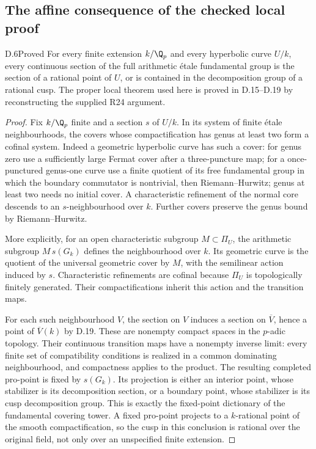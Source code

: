\subsection{The affine consequence of the checked local proof}

\begin{claim}{D.6}{Proved}
For every finite extension $k/\Q_p$ and every hyperbolic curve
$U/k$, every continuous section of the full arithmetic
\'{e}tale fundamental group is the section of a rational point
of $U$, or is contained in the decomposition group of a rational
cusp. The proper local theorem used here is proved in D.15--D.19
by reconstructing the supplied R24 argument.
\end{claim}
\begin{proof}
Fix $k/\Q_p$ finite and a section $s$ of $U/k$. In its system of
finite \'etale neighbourhoods, the covers whose compactification
has genus at least two form a cofinal system. Indeed a geometric
hyperbolic curve has such a cover: for genus zero use a sufficiently
large Fermat cover after a three-puncture map; for a once-punctured
genus-one curve use a finite quotient of its free fundamental group
in which the boundary commutator is nontrivial, then
Riemann--Hurwitz; genus at least two needs no initial cover.
A characteristic refinement of the normal core descends to an
$s$-neighbourhood over $k$. Further covers preserve the
genus bound by Riemann--Hurwitz.

More explicitly, for an open characteristic subgroup
$M\subset\Pi_U$, the arithmetic subgroup $M\,s(G_k)$ defines
the neighbourhood over $k$. Its geometric curve is the quotient
of the universal geometric cover by $M$, with the semilinear
action induced by $s$. Characteristic refinements are cofinal
because $\Pi_U$ is topologically finitely generated. Their
compactifications inherit this action and the transition maps.

For each such neighbourhood $V$, the section on $V$ induces a
section on $\overline V$, hence a point of $\overline V(k)$ by
D.19. These are nonempty compact spaces in the
$p$-adic topology. Their continuous transition maps have a
nonempty inverse limit: every finite set of compatibility
conditions is realized in a common dominating neighbourhood, and
compactness applies to the product. The resulting completed
pro-point is fixed by $s(G_k)$. Its projection is either an
interior point, whose stabilizer is its decomposition section,
or a boundary point, whose stabilizer is its cusp decomposition
group. This is exactly the fixed-point dictionary of the
fundamental covering tower. A fixed pro-point projects to a
$k$-rational point of the smooth compactification, so the cusp
in this conclusion is rational over the original field, not
only over an unspecified finite extension.
\end{proof}

